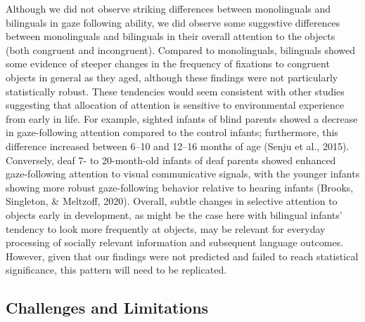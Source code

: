 \documentclass[
  english,
  ,man,floatsintext]{apa6}
\begin{document}
Although we did not observe striking differences between monolinguals and bilinguals in gaze following ability, we did observe some suggestive differences between monolinguals and bilinguals in their overall attention to the objects (both congruent and incongruent). Compared to monolinguals, bilinguals showed some evidence of steeper changes in the frequency of fixations to congruent objects in general as they aged, although these findings were not particularly statistically robust. These tendencies would seem consistent with other studies suggesting that allocation of attention is sensitive to environmental experience from early in life. For example, sighted infants of blind parents showed a decrease in gaze-following attention compared to the control infants; furthermore, this difference increased between 6--10 and 12--16 months of age (Senju et al., 2015). Conversely, deaf 7- to 20-month-old infants of deaf parents showed enhanced gaze-following attention to visual communicative signals, with the younger infants showing more robust gaze-following behavior relative to hearing infants (Brooks, Singleton, \& Meltzoff, 2020). Overall, subtle changes in selective attention to objects early in development, as might be the case here with bilingual infants' tendency to look more frequently at objects, may be relevant for everyday processing of socially relevant information and subsequent language outcomes. However, given that our findings were not predicted and failed to reach statistical significance, this pattern will need to be replicated.

\hypertarget{challenges-and-limitations}{%
\subsection{Challenges and Limitations}\label{challenges-and-limitations}}
\end{document}
